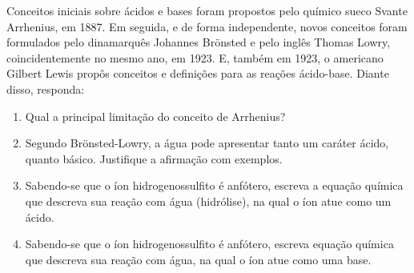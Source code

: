 Conceitos iniciais sobre ácidos e bases foram propostos pelo químico sueco Svante Arrhenius, em 1887. Em seguida, e de forma independente, novos conceitos foram formulados pelo dinamarquês Johannes Brönsted e pelo inglês Thomas Lowry, coincidentemente no mesmo ano, em 1923. E, também em 1923, o americano Gilbert Lewis propôs conceitos e definições para as reações ácido-base. Diante disso, responda:

\begin{enumerate}[label = (\alph*)]
	\item Qual a principal limitação do conceito de Arrhenius?
	\item Segundo Brönsted-Lowry, a água pode apresentar tanto um caráter ácido, quanto básico. Justifique a afirmação com exemplos.
	\item Sabendo-se que o íon hidrogenossulfito é anfótero, escreva a equação química que descreva sua reação com água (hidrólise), na qual o íon atue como um ácido.
	\item Sabendo-se que o íon hidrogenossulfito é anfótero, escreva equação química que descreva sua reação com água, na qual o íon atue como uma base.
\end{enumerate}